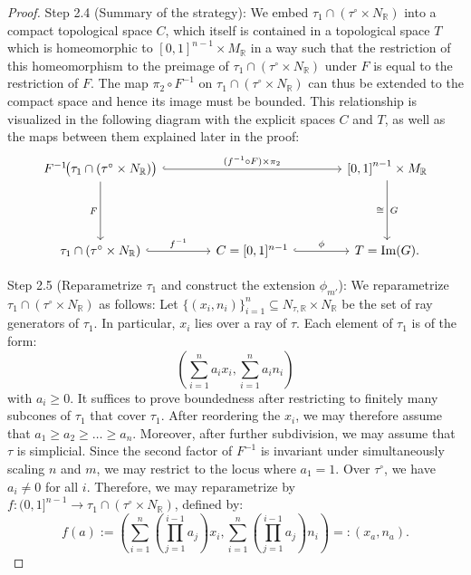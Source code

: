 \documentclass[11pt]{amsart}
\theoremstyle{definition}
\theoremstyle{remark}
\DeclareMathOperator{\im}{Im}
\begin{document}
\begin{proof}
	Step 2.4 (Summary of the strategy): We embed $\tau_1\cap (\tau^{\circ}\times N_{\mathbb{R}})$ into a compact topological space $C$,
	which itself is contained in a topological space $T$ which is homeomorphic to $[0,1]^{n-1}\times M_{\mathbb{R}}$
	in a way such that the restriction of this homeomorphism to the preimage of $\tau_1\cap (\tau^{\circ}\times N_{\mathbb{R}})$ under $F$ is
	equal to the restriction of $F$. The map $\pi_2\circ F^{-1}$ on $\tau_1\cap (\tau^{\circ}\times N_{\mathbb{R}})$ can thus be extended
	to the compact space and hence its image must be bounded. This relationship is visualized in the following diagram with the explicit
	spaces $C$ and $T$, as well as the maps between them explained later in the proof:
	$$\begin{tikzcd}[row sep=4.6em, column sep=3.8em, ampersand replacement=\&]
		F^{-1}\!\bigl(\tau_1 \cap (\tau^\circ \times N_{\mathbb{R}})\bigr)
		\arrow[rr, hook,"(f^{-1}\circ F)\times \pi_2"]
		\arrow[d, "F"']
		\&
		\& {[}0,1{]}^{n-1} \times M_{\mathbb{R}}
		\arrow[d, "G", "\cong"']
		\\
		\tau_1 \cap (\tau^\circ \times N_{\mathbb{R}})
		\arrow[r, hook, "f^{-1}"]
		\& C=[0,1]^{n-1}
		\arrow[r, hook,"\phi"]
		\& T=\im(G).
	\end{tikzcd}$$

	Step 2.5 (Reparametrize $\tau_1$ and construct the extension $\phi_{m'}$): We reparametrize $\tau_1\cap (\tau^{\circ}\times N_{\mathbb{R}})$
	as follows: Let $\{(x_i,n_i)\}_{i=1}^{n}\subseteq N_{\tau,\mathbb{R}}\times N_{\mathbb{R}}$
	be the set of ray generators of $\tau_1$. In particular, $x_i$ lies over a ray of $\tau$. Each element of $\tau_1$ is of the form:
	$$\left(\sum_{i=1}^{n}a_ix_i,\sum_{i=1}^{n}a_in_i\right)$$
	with $a_i\ge 0$.
	It suffices to prove boundedness after restricting to finitely many subcones of $\tau_1$ that cover $\tau_1$. After reordering the $x_i$,
	we may therefore assume that $a_1\ge a_2\ge\dots\ge a_n$. Moreover, after further subdivision, we may assume that $\tau$ is simplicial. Since the second
	factor of $F^{-1}$ is invariant under simultaneously scaling $n$ and $m$, we may restrict to the locus where
	$a_1=1$. Over $\tau^{\circ}$, we have $a_i\neq 0$ for all $i$.
	Therefore, we may reparametrize by $f:(0,1]^{n-1}\to \tau_1\cap (\tau^{\circ}\times N_{\mathbb{R}})$, defined by:
	$$f(a):=\left(\sum_{i=1}^{n}\left(\prod_{j=1}^{i-1}a_j\right)x_i,\sum_{i=1}^{n}\left(\prod_{j=1}^{i-1}a_j\right)n_i\right)=:(x_a,n_a).$$


\end{proof}
\end{document}
